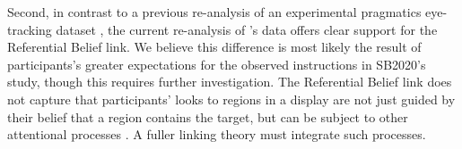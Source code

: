 \documentclass[10pt,letterpaper]{article}
\begin{document}
Second,  in  contrast to a previous re-analysis of an experimental pragmatics eye-tracking dataset \cite{QingLD2018}, the current re-analysis of 's data offers clear support for the Referential Belief link.  We believe this difference is most likely the result of participants's greater expectations for the observed instructions in SB2020's study, though this requires further investigation. %
The Referential Belief link does not capture that participants' looks to regions in a display are not just guided by their belief that a region contains the target, but can be subject to other attentional processes \cite{Allopenna1998}. A fuller linking theory must integrate such processes.


\end{document}
